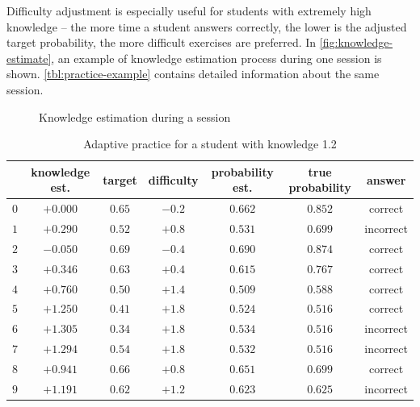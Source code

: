 \documentclass[12pt, twoside]{fithesis2}
\renewcommand{\_}{\leavevmode \kern0.07em\vbox{\hrule width0.4em}}
\begin{document}
Difficulty adjustment is especially useful for students with extremely high knowledge -- the more time a student answers correctly, the lower is the adjusted target probability, the more difficult exercises are preferred.
In \autoref{fig:knowledge-estimate}, an example of knowledge estimation process during one session is shown.
\autoref{tbl:practice-example} contains detailed information about the same session.

\begin{figure}[h]
\centering
{}
  \caption{Knowledge estimation during a session}
  \label{fig:knowledge-estimate}
\end{figure}


\begin{table}[h]
\begin{center}
\begin{tabular}{| c | c | c | c | c | c || c |}
  \hline
  & knowledge est. &  target & difficulty & probability est. & true probability & answer\\
  \hline
  $0$ & $+0.000$ & $0.65$ & $-0.2$ & $0.662$ & $0.852$ &  correct   \\
  $1$ & $+0.290$ & $0.52$ & $+0.8$ & $0.531$ & $0.699$ &  incorrect \\
  $2$ & $-0.050$ & $0.69$ & $-0.4$ & $0.690$ & $0.874$ &  correct   \\
  $3$ & $+0.346$ & $0.63$ & $+0.4$ & $0.615$ & $0.767$ &  correct   \\
  $4$ & $+0.760$ & $0.50$ & $+1.4$ & $0.509$ & $0.588$ &  correct   \\
  $5$ & $+1.250$ & $0.41$ & $+1.8$ & $0.524$ & $0.516$ &  correct   \\
  $6$ & $+1.305$ & $0.34$ & $+1.8$ & $0.534$ & $0.516$ &  incorrect \\
  $7$ & $+1.294$ & $0.54$ & $+1.8$ & $0.532$ & $0.516$ &  incorrect \\
  $8$ & $+0.941$ & $0.66$ & $+0.8$ & $0.651$ & $0.699$ &  correct   \\
  $9$ & $+1.191$ & $0.62$ & $+1.2$ & $0.623$ & $0.625$ &  incorrect \\
  \hline
\end{tabular}
\end{center}
\caption{Adaptive practice for a student with knowledge 1.2}
\label{tbl:practice-example}
\end{table}
\end{document}
